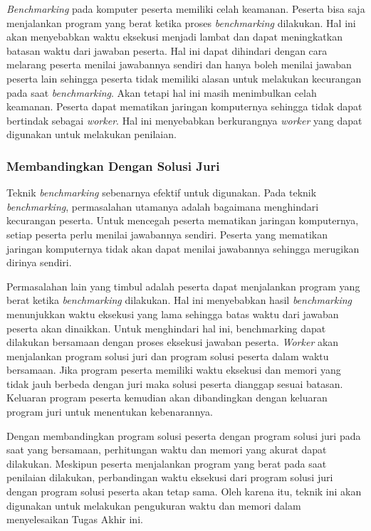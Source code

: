 \par \textit{Benchmarking} pada komputer peserta memiliki celah keamanan. Peserta bisa saja menjalankan program yang berat ketika proses \textit{benchmarking} dilakukan. Hal ini akan menyebabkan waktu eksekusi menjadi lambat dan dapat meningkatkan batasan waktu dari jawaban peserta. Hal ini dapat dihindari dengan cara melarang peserta menilai jawabannya sendiri dan hanya boleh menilai jawaban peserta lain sehingga peserta tidak memiliki alasan untuk melakukan kecurangan pada saat \textit{benchmarking}. Akan tetapi hal ini masih menimbulkan celah keamanan. Peserta dapat mematikan jaringan komputernya sehingga tidak dapat bertindak sebagai \textit{worker}. Hal ini menyebabkan berkurangnya \textit{worker} yang dapat digunakan untuk melakukan penilaian.

\subsubsection{Membandingkan Dengan Solusi Juri} \label{subsec:time-memory-measure-compare-with-jury}

\par Teknik \textit{benchmarking} sebenarnya efektif untuk digunakan. Pada teknik \textit{benchmarking}, permasalahan utamanya adalah bagaimana menghindari kecurangan peserta. Untuk mencegah peserta mematikan jaringan komputernya, setiap peserta perlu menilai jawabannya sendiri. Peserta yang mematikan jaringan komputernya tidak akan dapat menilai jawabannya sehingga merugikan dirinya sendiri.

\par Permasalahan lain yang timbul adalah peserta dapat menjalankan program yang berat ketika \textit{benchmarking} dilakukan. Hal ini menyebabkan hasil \textit{benchmarking} menunjukkan waktu eksekusi yang lama sehingga batas waktu dari jawaban peserta akan dinaikkan. Untuk menghindari hal ini, benchmarking dapat dilakukan bersamaan dengan proses eksekusi jawaban peserta. \textit{Worker} akan menjalankan program solusi juri dan program solusi peserta dalam waktu bersamaan. Jika program peserta memiliki waktu eksekusi dan memori yang tidak jauh berbeda dengan juri maka solusi peserta dianggap sesuai batasan. Keluaran program peserta kemudian akan dibandingkan dengan keluaran program juri untuk menentukan kebenarannya.

\par Dengan membandingkan program solusi peserta dengan program solusi juri pada saat yang bersamaan, perhitungan waktu dan memori yang akurat dapat dilakukan. Meskipun peserta menjalankan program yang berat pada saat penilaian dilakukan, perbandingan waktu eksekusi dari program solusi juri dengan program solusi peserta akan tetap sama. Oleh karena itu, teknik ini akan digunakan untuk melakukan pengukuran waktu dan memori dalam menyelesaikan Tugas Akhir ini.


